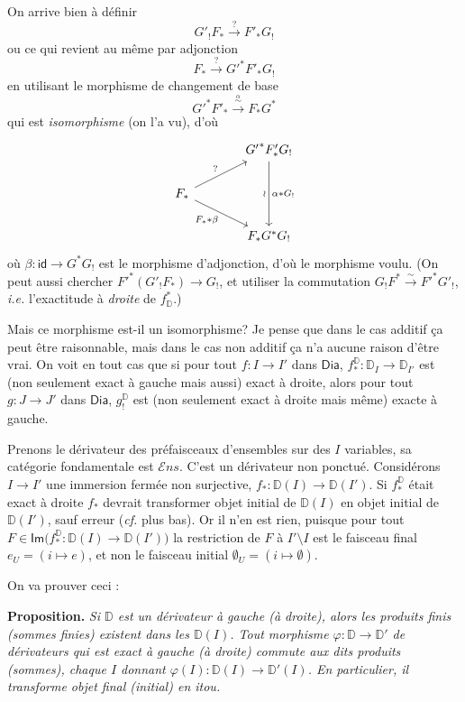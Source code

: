 \documentclass[11pt]{article}
\newcommand{\printedpage}[1]{\marginpar{\footnotesize p.~#1}}
\newcommand{\msp}[1]{\marginpar{\footnotesize [#1]}}
\newcommand{\Dia}{\mathsf{Dia}}
\newcommand{\id}{\mathsf{id}}
\newcommand{\Ens}{\mathcal{E}ns}
\newcommand{\D}{\mathbb{D}}
\newcommand{\sIm}{\mathsf{Im}}
\begin{document}
\printedpage{17}

On arrive bien à définir
\[
G'_!F_* \xrightarrow{?} F'_*G_!
\]
ou ce qui revient au même par adjonction
\[
F_* \xrightarrow{?} {G'}^*F'_*G_!
\]
en utilisant le morphisme de changement de base
\[
{G'}^*F'_* \xrightarrow{\overset{\alpha}{\sim}} F_*G^*
\]
qui est \textit{isomorphisme} (on l'a vu), d'où
\[
\begin{tikzcd}[column sep=large, row sep=normal]
& {G'}^*F'_*G_! \arrow[dd, "\wr"', "\alpha * G_!"] \\
F_* \arrow[ur, "?"] \arrow[dr, "F_* * \beta"'] & \\
& F_*G^*G_!
\end{tikzcd}
\]
où $\beta : \id \to G^*G_!$ est le morphisme d'adjonction, d'où le morphisme voulu. (On peut aussi chercher ${F'}^*(G'_!F_*) \to G_!$, et utiliser la commutation $G_!F^* \overset{\sim}{\to} {F'}^*G'_!$, \textit{i.e.} l'exactitude à \textit{droite} de $f^*_{\D}$.)

\msp{page 25}

Mais ce morphisme est-il un isomorphisme? Je pense que dans le cas additif ça peut être raisonnable, mais dans le cas non additif ça n'a aucune raison d'être vrai. On voit en tout cas que si pour tout $f : I \to I'$ dans $\Dia$, $f^{\D}_* : \D_I \to \D_{I'}$ est (non seulement exact à gauche mais aussi) exact à droite, alors pour tout $g : J \to J'$ dans $\Dia$, $g^{\D}_!$ est (non seulement exact à droite mais même) exacte à gauche. %

Prenons le dérivateur des préfaisceaux d'ensembles sur des $I$ variables, sa catégorie fondamentale est $\Ens$. C'est un dérivateur non ponctué. Considérons $I \to I'$ une immersion fermée non surjective, $f_* : \D(I) \to \D(I')$. Si $f^{\D}_*$ était exact à droite $f_*$ devrait transformer objet initial de $\D(I)$ en objet initial de $\D(I')$, sauf erreur (\textit{cf.} plus bas). Or il n'en est rien, puisque pour tout $F \in \sIm\bigl(f^{\D}_* : \D(I) \to \D(I')\bigr)$ la restriction de $F$ à $I' \setminus I$ est le faisceau final $e_U = (i \mapsto e)$, et non le faisceau initial $\emptyset_U = (i \mapsto \emptyset)$.

On va prouver ceci :

\textbf{Proposition.} \textit{Si $\D$ est un dérivateur à gauche (à droite), alors les produits finis (sommes finies) existent dans les $\D(I)$. Tout morphisme $\varphi : \D \to \D'$ de dérivateurs qui est exact à gauche (à droite) commute aux dits produits (sommes), chaque $I$ donnant $\varphi(I) : \D(I) \to \D'(I)$. En particulier, il transforme objet final (initial) en itou.}
\end{document}
